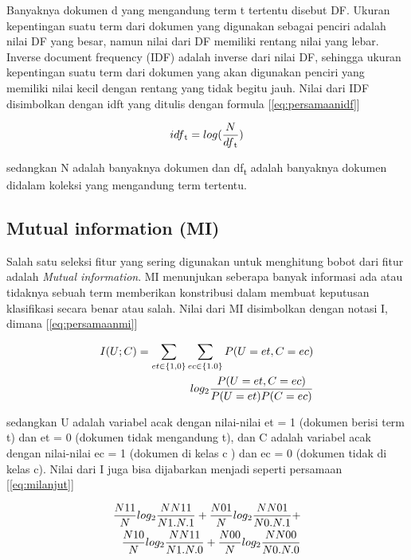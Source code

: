 Banyaknya dokumen d yang mengandung term t tertentu disebut DF. Ukuran kepentingan suatu term dari dokumen yang digunakan sebagai penciri adalah nilai DF yang besar, namun nilai dari DF memiliki rentang nilai yang lebar. Inverse document frequency (IDF) adalah inverse dari nilai DF, sehingga ukuran kepentingan suatu term dari dokumen yang akan digunakan penciri yang memiliki nilai kecil dengan rentang yang tidak begitu jauh. Nilai dari IDF disimbolkan dengan  idft  yang ditulis dengan formula [\ref{eq:persamaanidf}]

\begin{equation}
	idf\textsubscript{t} = log(\frac{N}{df\textsubscript{t}})
		\label{eq:persamaanidf}
\end{equation}

sedangkan N adalah banyaknya dokumen dan df\textsubscript{t} adalah banyaknya dokumen didalam koleksi yang mengandung term tertentu.

\subsection*{Mutual information (MI)}

Salah satu seleksi fitur yang sering digunakan untuk menghitung bobot dari fitur adalah \textit{Mutual information}. MI menunjukan seberapa banyak informasi ada atau tidaknya sebuah term memberikan konstribusi dalam membuat keputusan klasifikasi secara benar atau salah. Nilai dari MI disimbolkan dengan notasi I, dimana [\ref{eq:persamaanmi}]

\begin{equation}
	\begin{split}
		\tiny
		I(U;C) = \sum\limits_{et\in\{1,0\}}\sum\limits_{ec\in\{1.0\}} P(U = et, C = ec) \\
		log_2 \frac{P(U = et,C =ec)}{P(U = et)P(C = ec)} 
		\label{eq:persamaanmi}
		\normalsize
	\end{split}
\end{equation}

sedangkan U adalah variabel acak dengan nilai-nilai et = 1 (dokumen berisi term t) dan et = 0 (dokumen tidak mengandung t), dan C adalah variabel acak dengan nilai-nilai ec = 1 (dokumen di kelas c ) dan ec = 0 (dokumen tidak di kelas c). Nilai dari I juga bisa dijabarkan menjadi seperti persamaan  [\ref{eq:milanjut}]

\begin{equation}
	\begin{split}
		\tiny
		\frac{N11}{N}log_2\frac{NN11}{N1.N.1} + \frac{N01}{N}log_2\frac{NN01}{N0.N.1} + \\
		\frac{N10}{N}log_2\frac{NN11}{N1.N.0} + \frac{N00}{N}log_2\frac{NN00}{N0.N.0}
		\label{eq:milanjut}
		\normalsize
	\end{split}
\end{equation}

